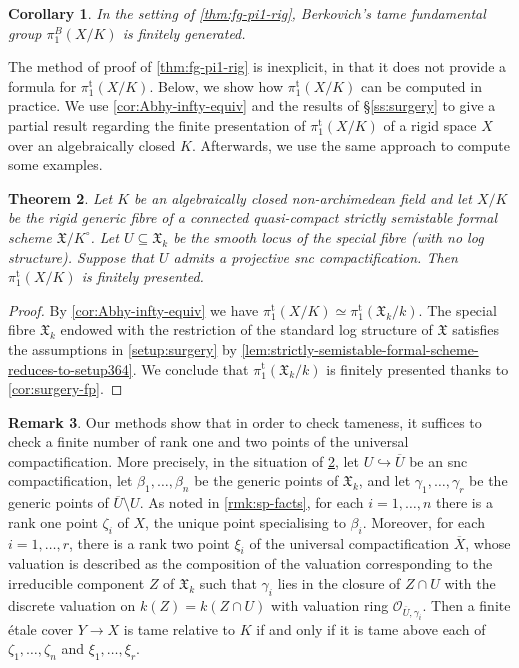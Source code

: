 \documentclass[a4paper,twoside,11pt,reqno]{amsart}
\newcommand{\cO}{{\mathcal O}}
\newcommand{\fX}{{\mathfrak{X}}}
\newcommand{\pitame}{\pi_1^{\mathrm{t}}}
\newtheorem{thm}{Theorem}[subsection]
\newtheorem{cor}[thm]{Corollary}
\theoremstyle{definition}
\newtheorem{rmk}[thm]{Remark}
\numberwithin{equation}{subsection}
\begin{document}
\begin{cor}
    In the setting of \cref{thm:fg-pi1-rig}, Berkovich's tame fundamental group $\pi_1^B(X/K)$ is finitely generated.
\end{cor}

The method of proof of \cref{thm:fg-pi1-rig} is inexplicit, in that it does not provide a formula for $\pitame(X/K)$. Below, we show how $\pitame(X/K)$ can be computed in practice.  We use \cref{cor:Abhy-infty-equiv} and the results of \S\ref{ss:surgery} to give a partial result regarding the finite presentation of $\pitame(X/K)$ of a rigid space $X$ over an algebraically closed $K$. Afterwards, we use the same approach to compute some examples.

\begin{thm} \label{thm:fp-sometimes}
    Let $K$ be an algebraically closed non-archimedean field and let $X/K$ be the rigid generic fibre of a connected quasi-compact strictly semistable formal scheme $\fX/K^\circ$. Let $U\subseteq \fX_k$ be the smooth locus of the special fibre (with no log structure). Suppose that $U$ admits a projective snc compactification. Then $\pitame(X/K)$ is finitely presented. 
\end{thm}

\begin{proof}
By \cref{cor:Abhy-infty-equiv} we have $\pitame(X/K)\simeq \pitame(\fX_k/k)$.
The special fibre $\fX_k$ endowed with the restriction of the standard log structure of $\fX$ satisfies the assumptions in \cref{setup:surgery} by \cref{lem:strictly-semistable-formal-scheme-reduces-to-setup364}. We conclude that $\pitame(\fX_k/k)$ is finitely presented thanks to \cref{cor:surgery-fp}.
\end{proof}

\begin{rmk}
    Our methods show that in order to check tameness, it suffices to check a finite number of rank one and two points of the universal compactification. More precisely, in the situation of \cref{thm:fp-sometimes}, let $U\hookrightarrow \overline{U}$ be an snc compactification, let $\beta_1, \dots, \beta_n$ be the generic points of $\fX_k$, and let $\gamma_1, \dots, \gamma_r$ be the generic points of $\overline{U}\setminus U$. As noted in \cref{rmk:sp-facts}, for each $i=1,\dots, n$ there is a rank one point $\zeta_i$ of $X$, the unique point specialising to $\beta_i$. Moreover, for each $i=1,\dots, r$, there is a rank two point $\xi_i$ of the universal compactification $\overline{X}$, whose valuation is described as the composition of the valuation corresponding to the irreducible component $Z$ of $\fX_k$ such that $\gamma_i$ lies in the closure of $Z \cap U$ with the discrete valuation on $k(Z) = k(Z \cap U)$ with valuation ring $\cO_{\overline{U}, \gamma_i}$. Then a finite \'etale cover $Y \to X$ is tame relative to $K$ if and only if it is tame above each of $\zeta_1,\dots,\zeta_n$ and $\xi_1, \dots, \xi_r$. 
\end{rmk}
\end{document}
